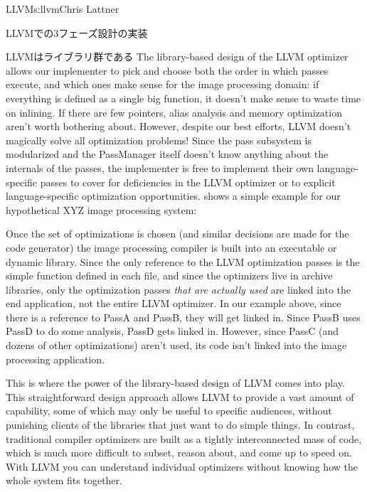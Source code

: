 \begin{aosachapter}{LLVM}{s:llvm}{Chris Lattner}
\begin{aosasect1}{LLVMでの3フェーズ設計の実装}
\begin{aosasect2}{LLVMはライブラリ群である}
The library-based design of the LLVM optimizer allows our implementer
to pick and choose both the order in which passes execute, and which
ones make sense for the image processing domain: if everything is
defined as a single big function, it doesn't make sense to waste time
on inlining.  If there are few pointers, alias analysis and memory
optimization aren't worth bothering about.  However, despite our best
efforts, LLVM doesn't magically solve all optimization problems!
Since the pass subsystem is modularized and the PassManager itself
doesn't know anything about the internals of the passes, the
implementer is free to implement their own language-specific passes to
cover for deficiencies in the LLVM optimizer or to explicit
language-specific optimization opportunities.
 shows a simple example for our hypothetical
XYZ image processing system:


Once the set of optimizations is chosen (and similar decisions are
made for the code generator) the image processing compiler is built
into an executable or dynamic library.  Since the only reference to
the LLVM optimization passes is the simple  function
defined in each  file, and since the optimizers live in
 archive libraries, only the optimization passes \emph{that
are actually used} are linked into the end application, not the
entire LLVM optimizer.  In our example above, since there is a
reference to PassA and PassB, they will get linked in.  Since PassB
uses PassD to do some analysis, PassD gets linked in.  However, since
PassC (and dozens of other optimizations) aren't used, its code isn't
linked into the image processing application.

This is where the power of the library-based design of LLVM comes into
play. This straightforward design approach allows LLVM to provide a
vast amount of capability, some of which may only be useful to
specific audiences, without punishing clients of the libraries that
just want to do simple things. In contrast, traditional compiler
optimizers are built as a tightly interconnected mass of code, which
is much more difficult to subset, reason about, and come up to speed
on. With LLVM you can understand individual optimizers without knowing
how the whole system fits together.


\end{aosasect2}
\end{aosasect1}
\end{aosachapter}
